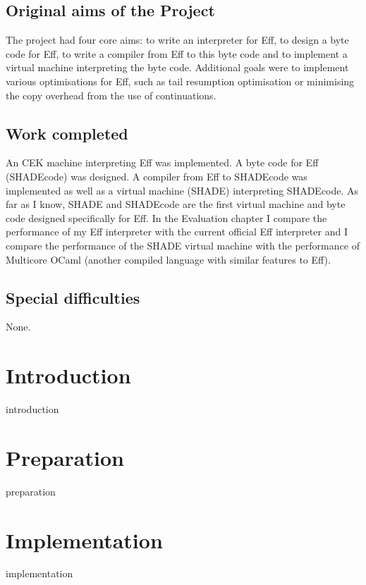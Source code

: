 \documentclass[%
    12pt,
    a4paper,
    bibliography=toc,
    listof=leveldown,%
    oneside
]{book}
\begin{document}
\section*{Original aims of the Project}

The project had four core aims: to write an interpreter for Eff, to design a byte code for Eff, to write a compiler from Eff to this byte code
and to implement a virtual machine interpreting the byte code. Additional goals were to implement various optimisations for Eff, such as
tail resumption optimisation or minimising the copy overhead from the use of continuations.

\section*{Work completed}

An CEK machine interpreting Eff was implemented. A byte code for Eff (SHADEcode) was designed. A compiler from Eff to SHADEcode was
implemented as well as a virtual machine (SHADE) interpreting SHADEcode. As far as I know, SHADE and SHADEcode are the first
virtual machine and byte code designed specifically for Eff.
In the Evaluation chapter
I compare the performance of my Eff interpreter with the current official Eff interpreter and I compare the performance of the SHADE
virtual machine with the performance of Multicore OCaml (another compiled language with similar features to Eff).

\section*{Special difficulties}
None.

\tableofcontents

\newpage
\listoffigures
\listoftables
\lstlistoflistings

\mainmatter

\chapter{Introduction}
{introduction}

\chapter{Preparation}
{preparation}

\chapter{Implementation}
{implementation}
\end{document}
